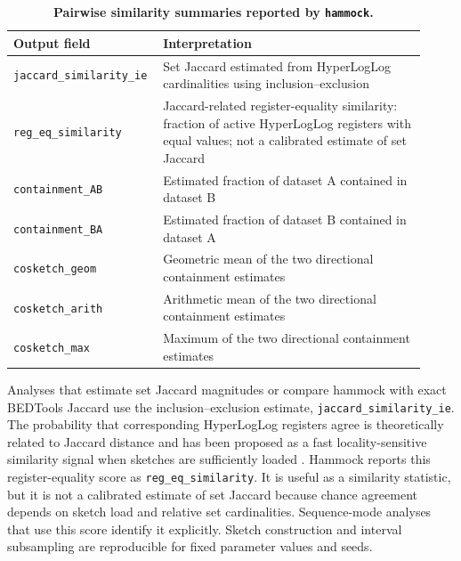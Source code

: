 \documentclass[11pt]{article}
\newcommand{\program}[1]{\texttt{#1}}
\begin{document}
\begin{table}[htbp]
\centering
\caption{\textbf{Pairwise similarity summaries reported by \program{hammock}.}}
\label{tab:hammock_similarity_outputs}
\begin{tabular}{>{\raggedright\arraybackslash}p{0.30\linewidth}
                >{\raggedright\arraybackslash}p{0.62\linewidth}}
\toprule
\textbf{Output field} & \textbf{Interpretation} \\
\midrule
\texttt{jaccard\_similarity\_ie}
& Set Jaccard estimated from HyperLogLog cardinalities using inclusion--exclusion \\

\texttt{reg\_eq\_similarity}
& Jaccard-related register-equality similarity: fraction of active HyperLogLog registers with equal values; not a calibrated estimate of set Jaccard \\

\texttt{containment\_AB}
& Estimated fraction of dataset A contained in dataset B \\

\texttt{containment\_BA}
& Estimated fraction of dataset B contained in dataset A \\

\texttt{cosketch\_geom}
& Geometric mean of the two directional containment estimates \\

\texttt{cosketch\_arith}
& Arithmetic mean of the two directional containment estimates \\

\texttt{cosketch\_max}
& Maximum of the two directional containment estimates \\
\bottomrule
\end{tabular}
\end{table}

Analyses that estimate set Jaccard magnitudes or compare hammock with exact BEDTools Jaccard use the inclusion--exclusion estimate, \texttt{jaccard\_similarity\_ie}. The probability that corresponding HyperLogLog registers agree is theoretically related to Jaccard distance and has been proposed as a fast locality-sensitive similarity signal when sketches are sufficiently loaded \cite{ertl}. Hammock reports this register-equality score as \texttt{reg\_eq\_similarity}. It is useful as a similarity statistic, but it is not a calibrated estimate of set Jaccard because chance agreement depends on sketch load and relative set cardinalities. Sequence-mode analyses that use this score identify it explicitly. Sketch construction and interval subsampling are reproducible for fixed parameter values and seeds.
\end{document}
